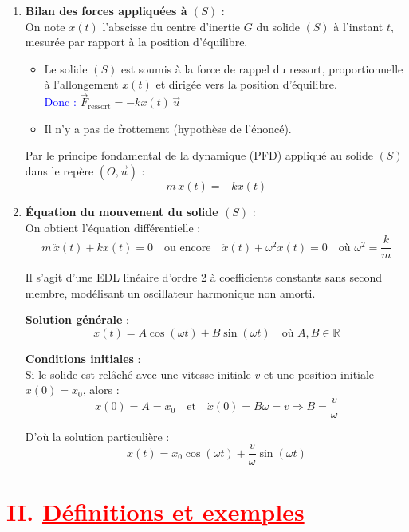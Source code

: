 \documentclass[a4paper,12pt]{article}
\begin{document}
\begin{enumerate}
    \item \textbf{Bilan des forces appliquées à $(S)$} :\\
    On note $x(t)$ l'abscisse du centre d'inertie $G$ du solide $(S)$ à l'instant $t$, mesurée par rapport à la position d'équilibre.

    \begin{itemize}
        \item Le solide $(S)$ est soumis à la force de rappel du ressort, proportionnelle à l’allongement $x(t)$ et dirigée vers la position d'équilibre.\\
        \textcolor{blue}{Donc :} \quad $\vec{F}_{\text{ressort}} = -k x(t) \, \vec{u}$

        \item Il n'y a pas de frottement (hypothèse de l'énoncé).
    \end{itemize}

    Par le principe fondamental de la dynamique (PFD) appliqué au solide $(S)$ dans le repère $(O,\vec{u})$ :
    \[
    m \, \ddot{x}(t) = -k x(t)
    \]

    \item \textbf{Équation du mouvement du solide $(S)$} :\\
    On obtient l'équation différentielle :
    \[
    m \, \ddot{x}(t) + k x(t) = 0
    \quad \text{ou encore} \quad
    \ddot{x}(t) + \omega^2 x(t) = 0 \quad \text{où } \omega^2 = \dfrac{k}{m}
    \]

    Il s’agit d’une EDL linéaire d’ordre 2 à coefficients constants sans second membre, modélisant un oscillateur harmonique non amorti.

    \textbf{Solution générale} :
    \[
    x(t) = A \cos(\omega t) + B \sin(\omega t) \quad \text{où } A, B \in \mathbb{R}
    \]

    \textbf{Conditions initiales} :\\
    Si le solide est relâché avec une vitesse initiale $v$ et une position initiale $x(0) = x_0$, alors :
    \[
    x(0) = A = x_0 \quad \text{et} \quad \dot{x}(0) = B \omega = v \Rightarrow B = \dfrac{v}{\omega}
    \]

    D’où la solution particulière :
    \[
    \boxed{x(t) = x_0 \cos(\omega t) + \dfrac{v}{\omega} \sin(\omega t)}
    \]
\end{enumerate}


\section*{\textcolor{red}{II. \underline{Définitions et exemples}}}
\end{document}
